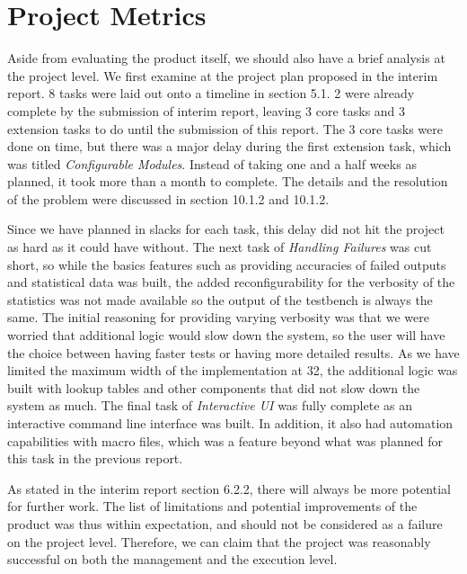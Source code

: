 \section{Project Metrics}
Aside from evaluating the product itself, we should also have a brief analysis at the project level.
We first examine at the project plan proposed in the interim report.
8 tasks were laid out onto a timeline in section 5.1.
2 were already complete by the submission of interim report, leaving 3 core tasks and 3 extension tasks to do until the submission of this report.
The 3 core tasks were done on time, but there was a major delay during the first extension task, which was titled \textit{Configurable Modules}.
Instead of taking one and a half weeks as planned, it took more than a month to complete.
The details and the resolution of the problem were discussed in section 10.1.2 and 10.1.2.

Since we have planned in slacks for each task, this delay did not hit the project as hard as it could have without.
The next task of \textit{Handling Failures} was cut short, so while the basics features such as providing accuracies of failed outputs and statistical data was built, the added reconfigurability for the verbosity of the statistics was not made available so the output of the testbench is always the same.
The initial reasoning for providing varying verbosity was that we were worried that additional logic would slow down the system, so the user will have the choice between having faster tests or having more detailed results.
As we have limited the maximum width of the implementation at 32, the additional logic was built with lookup tables and other components that did not slow down the system as much.
The final task of \textit{Interactive UI} was fully complete as an interactive command line interface was built.
In addition, it also had automation capabilities with macro files, which was a feature beyond what was planned for this task in the previous report.

As stated in the interim report section 6.2.2, there will always be more potential for further work.
The list of limitations and potential improvements of the product was thus within expectation, and should not be considered as a failure on the project level.
Therefore, we can claim that the project was reasonably successful on both the management and the execution level.
